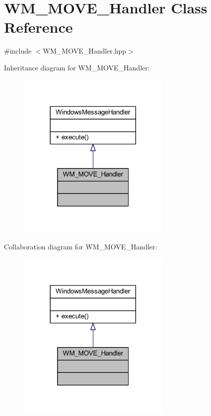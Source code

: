 \hypertarget{class_w_m___m_o_v_e___handler}{}\section{W\+M\+\_\+\+M\+O\+V\+E\+\_\+\+Handler Class Reference}
\label{class_w_m___m_o_v_e___handler}


{\ttfamily \#include $<$W\+M\+\_\+\+M\+O\+V\+E\+\_\+\+Handler.\+hpp$>$}



Inheritance diagram for W\+M\+\_\+\+M\+O\+V\+E\+\_\+\+Handler\+:\nopagebreak
\begin{figure}[H]
\begin{center}
\leavevmode
\includegraphics[width=209pt]{class_w_m___m_o_v_e___handler__inherit__graph}
\end{center}
\end{figure}


Collaboration diagram for W\+M\+\_\+\+M\+O\+V\+E\+\_\+\+Handler\+:\nopagebreak
\begin{figure}[H]
\begin{center}
\leavevmode
\includegraphics[width=209pt]{class_w_m___m_o_v_e___handler__coll__graph}
\end{center}
\end{figure}
